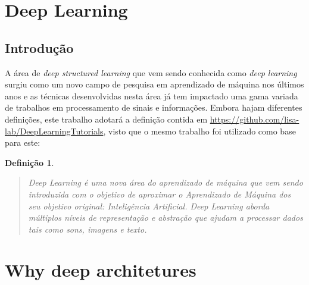
\section{Deep Learning}

\subsection{Introdução}

A área de \emph{deep structured learning} que vem sendo conhecida como
\emph{deep learning} surgiu como um novo campo de pesquisa em aprendizado de
máquina nos últimos anos e as técnicas desenvolvidas nesta área já tem
impactado uma gama variada de trabalhos em processamento de sinais e
informações. Embora hajam diferentes definições, este trabalho adotará a
definição contida em \url{https://github.com/lisa-lab/DeepLearningTutorials}, visto
que o mesmo trabalho foi utilizado como base para este\cite{deng2014deep}:

\newtheorem{def-deep-learning}{Definição}

\begin{def-deep-learning}

  \begin{quote}\emph{Deep Learning} é uma nova área do aprendizado de máquina que vem sendo
introduzida com o objetivo de aproximar o Aprendizado de Máquina dos seu
objetivo original: Inteligência Artificial. \emph{Deep Learning} aborda
múltiplos níveis de representação e abstração que ajudam a processar dados tais
como sons, imagens e texto.
\end{quote}

\end{def-deep-learning}





\section{Why deep architetures}



